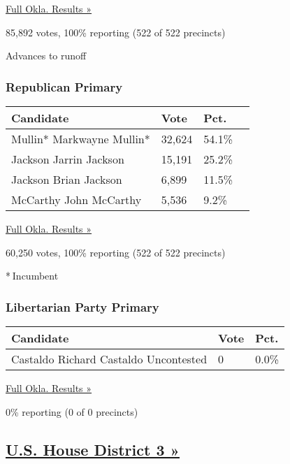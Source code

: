 \href{https://www.nytimes3xbfgragh.onion/elections/results/oklahoma}{Full
Okla. Results »}

85,892 votes, 100\% reporting (522 of 522 precincts)

 Advances to runoff

\hypertarget{republican-primary-2}{%
\subsubsection{Republican Primary}\label{republican-primary-2}}

\begin{longtable}[]{@{}llll@{}}
\toprule
Candidate & Vote & Pct. &\tabularnewline
\midrule
\endhead
 Mullin* Markwayne Mullin* & 32,624 & 54.1\% &\tabularnewline
 Jackson Jarrin Jackson & 15,191 & 25.2\% &\tabularnewline
 Jackson Brian Jackson & 6,899 & 11.5\% &\tabularnewline
 McCarthy John McCarthy & 5,536 & 9.2\% &\tabularnewline
\bottomrule
\end{longtable}

\href{https://www.nytimes3xbfgragh.onion/elections/results/oklahoma}{Full
Okla. Results »}

60,250 votes, 100\% reporting (522 of 522 precincts)

* Incumbent

\hypertarget{libertarian-party-primary-1}{%
\subsubsection{Libertarian Party
Primary}\label{libertarian-party-primary-1}}

\begin{longtable}[]{@{}lll@{}}
\toprule
Candidate & Vote & Pct.\tabularnewline
\midrule
\endhead
 Castaldo Richard Castaldo Uncontested & 0 & 0.0\%\tabularnewline
\bottomrule
\end{longtable}

\href{https://www.nytimes3xbfgragh.onion/elections/results/oklahoma}{Full
Okla. Results »}

0\% reporting (0 of 0 precincts)

\hypertarget{us-house-district-3-}{%
\subsection{\texorpdfstring{\href{https://www.nytimes3xbfgragh.onion/elections/results/oklahoma-house-district-3-primary-election}{U.S.
House District 3
»}}{U.S. House District 3 »}}\label{us-house-district-3-}}

